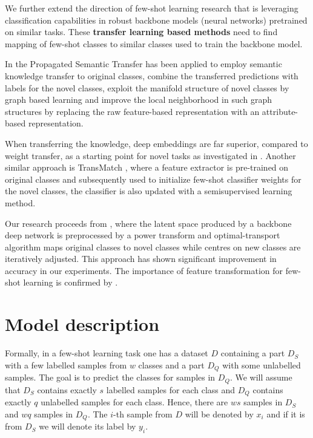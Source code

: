 \documentclass[letterpaper]{article} \usepackage{aaai20}  \usepackage{times}  \usepackage{helvet} \usepackage{courier}  \usepackage[hyphens]{url}  \usepackage{graphicx} \urlstyle{rm} \def\UrlFont{\rm}  \usepackage{graphicx}  \frenchspacing  \setlength{\pdfpagewidth}{8.5in}  \setlength{\pdfpageheight}{11in}  \usepackage[ruled,vlined]{algorithm2e}
\begin{document}
We further extend the direction of few-shot learning research that is leveraging classification capabilities in robust backbone models (neural networks) pretrained on similar tasks. These {\bf transfer learning based methods} need to find mapping of few-shot classes to similar classes used to train the backbone model. 

In \cite{rohrbach2013transfer} the Propagated Semantic Transfer has been applied to employ semantic knowledge transfer to original classes, combine the transferred predictions with labels for the novel classes, exploit the manifold structure of novel classes by graph based learning and improve the local neighborhood in such graph structures by replacing the raw feature-based representation with an attribute-based representation. 

When transferring the knowledge, deep embeddings are far superior, compared to weight transfer, as a starting point for novel tasks as investigated in \cite{scott2018adapted}. Another similar approach is TransMatch \cite{yu2020transmatch}, where a feature extractor is pre-trained on original classes and subsequently used to initialize few-shot classifier weights for the novel classes, the classifier is also updated with a semisupervised learning method. 

Our research proceeds from \cite{hu2020leveraging}, where the latent space produced by a backbone deep network is preprocessed by a power transform and optimal-transport algorithm maps original classes to novel classes while centres on new classes are iteratively adjusted. This approach has shown significant improvement in accuracy in our experiments. The importance of feature transformation for few-shot learning is confirmed by \cite{wang2019simpleshot}. 

\section{Model description}
Formally, in a few-shot learning task one has a dataset $D$ containing a part $D_S$ with a few labelled samples from $w$ classes and 
a part $D_Q$ with some unlabelled samples.
The goal is to predict the classes for samples in $D_Q$. We will assume that $D_S$ contains exactly $s$ labelled samples for each class and $D_Q$ contains 
exactly $q$ unlabelled samples for each class. Hence, there are $w s$ samples in $D_S$ and $w q$ samples in $D_Q$. The $i$-th sample from $D$ will be denoted by 
$x_i$ and if it is from $D_S$ we will denote its label by $y_i$.
\end{document}
